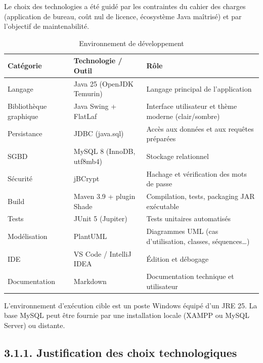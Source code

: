 \documentclass[11pt,a4paper]{report}
\begin{document}
Le choix des technologies a été guidé par les contraintes du cahier des charges (application de bureau, coût nul de licence, écosystème Java maîtrisé) et par l'objectif de maintenabilité.
\begin{table}[htbp]\centering\small
\begin{tabularx}{\textwidth}{|X|X|X|}
\hline\rowcolor{hdr}\textbf{Catégorie} & \textbf{Technologie / Outil} & \textbf{Rôle}\\ \hline
Langage & Java 25 (OpenJDK Temurin) & Langage principal de l'application\\ \hline
Bibliothèque graphique & Java Swing + FlatLaf & Interface utilisateur et thème moderne (clair/sombre)\\ \hline
Persistance & JDBC (java.sql) & Accès aux données et aux requêtes préparées\\ \hline
SGBD & MySQL 8 (InnoDB, utf8mb4) & Stockage relationnel\\ \hline
Sécurité & jBCrypt & Hachage et vérification des mots de passe\\ \hline
Build & Maven 3.9 + plugin Shade & Compilation, tests, packaging JAR exécutable\\ \hline
Tests & JUnit 5 (Jupiter) & Tests unitaires automatisés\\ \hline
Modélisation & PlantUML & Diagrammes UML (cas d'utilisation, classes, séquences…)\\ \hline
IDE & VS Code / IntelliJ IDEA & Édition et débogage\\ \hline
Documentation & Markdown & Documentation technique et utilisateur\\ \hline
\end{tabularx}
\caption{Environnement de développement}
\end{table}

L'environnement d'exécution cible est un poste Windows équipé d'un JRE 25. La base MySQL peut être fournie par une installation locale (XAMPP ou MySQL Server) ou distante.
\subsection*{3.1.1. Justification des choix technologiques}
\end{document}
